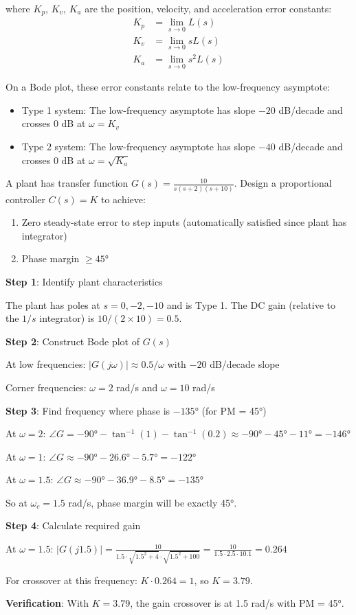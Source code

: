 where $K_p$, $K_v$, $K_a$ are the position, velocity, and acceleration error constants:
\begin{align}
K_p &= \lim_{s \to 0} L(s) \\
K_v &= \lim_{s \to 0} s L(s) \\
K_a &= \lim_{s \to 0} s^2 L(s)
\end{align}

On a Bode plot, these error constants relate to the low-frequency asymptote:
\begin{itemize}
    \item Type 1 system: The low-frequency asymptote has slope $-20$ dB/decade and crosses 0 dB at $\omega = K_v$
    \item Type 2 system: The low-frequency asymptote has slope $-40$ dB/decade and crosses 0 dB at $\omega = \sqrt{K_a}$
\end{itemize}

\begin{example}
\label{ex:bode_gain}
A plant has transfer function $G(s) = \frac{10}{s(s+2)(s+10)}$. Design a proportional controller $C(s) = K$ to achieve:
\begin{enumerate}
    \item Zero steady-state error to step inputs (automatically satisfied since plant has integrator)
    \item Phase margin $\geq 45°$
\end{enumerate}

\textbf{Step 1}: Identify plant characteristics

The plant has poles at $s = 0, -2, -10$ and is Type 1. The DC gain (relative to the $1/s$ integrator) is $10/(2 \times 10) = 0.5$.

\textbf{Step 2}: Construct Bode plot of $G(s)$

At low frequencies: $|G(j\omega)| \approx 0.5/\omega$ with $-20$ dB/decade slope

Corner frequencies: $\omega = 2$ rad/s and $\omega = 10$ rad/s

\textbf{Step 3}: Find frequency where phase is $-135°$ (for PM = 45°)

At $\omega = 2$: $\angle G = -90° - \tan^{-1}(1) - \tan^{-1}(0.2) \approx -90° - 45° - 11° = -146°$

At $\omega = 1$: $\angle G \approx -90° - 26.6° - 5.7° = -122°$

At $\omega = 1.5$: $\angle G \approx -90° - 36.9° - 8.5° = -135°$

So at $\omega_c = 1.5$ rad/s, phase margin will be exactly 45°.

\textbf{Step 4}: Calculate required gain

At $\omega = 1.5$: $|G(j1.5)| = \frac{10}{1.5 \cdot \sqrt{1.5^2 + 4} \cdot \sqrt{1.5^2 + 100}} = \frac{10}{1.5 \cdot 2.5 \cdot 10.1} = 0.264$

For crossover at this frequency: $K \cdot 0.264 = 1$, so $K = 3.79$.

\textbf{Verification}: With $K = 3.79$, the gain crossover is at 1.5 rad/s with PM = 45°.
\end{example}

